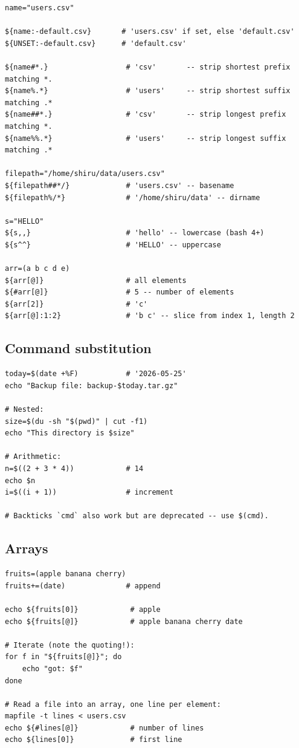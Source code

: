 \documentclass[11pt,a4paper]{article}
\begin{document}
\begin{lstlisting}[style=bashstyle]
name="users.csv"

${name:-default.csv}       # 'users.csv' if set, else 'default.csv'
${UNSET:-default.csv}      # 'default.csv'

${name#*.}                  # 'csv'       -- strip shortest prefix matching *.
${name%.*}                  # 'users'     -- strip shortest suffix matching .*
${name##*.}                 # 'csv'       -- strip longest prefix matching *.
${name%%.*}                 # 'users'     -- strip longest suffix matching .*

filepath="/home/shiru/data/users.csv"
${filepath##*/}             # 'users.csv' -- basename
${filepath%/*}              # '/home/shiru/data' -- dirname

s="HELLO"
${s,,}                      # 'hello' -- lowercase (bash 4+)
${s^^}                      # 'HELLO' -- uppercase

arr=(a b c d e)
${arr[@]}                   # all elements
${#arr[@]}                  # 5 -- number of elements
${arr[2]}                   # 'c'
${arr[@]:1:2}               # 'b c' -- slice from index 1, length 2
\end{lstlisting}

\subsection*{Command substitution}

\begin{lstlisting}[style=bashstyle]
today=$(date +%F)           # '2026-05-25'
echo "Backup file: backup-$today.tar.gz"

# Nested:
size=$(du -sh "$(pwd)" | cut -f1)
echo "This directory is $size"

# Arithmetic:
n=$((2 + 3 * 4))            # 14
echo $n
i=$((i + 1))                # increment

# Backticks `cmd` also work but are deprecated -- use $(cmd).
\end{lstlisting}

\subsection*{Arrays}

\begin{lstlisting}[style=bashstyle]
fruits=(apple banana cherry)
fruits+=(date)              # append

echo ${fruits[0]}            # apple
echo ${fruits[@]}            # apple banana cherry date

# Iterate (note the quoting!):
for f in "${fruits[@]}"; do
    echo "got: $f"
done

# Read a file into an array, one line per element:
mapfile -t lines < users.csv
echo ${#lines[@]}            # number of lines
echo ${lines[0]}             # first line
\end{lstlisting}
\end{document}
